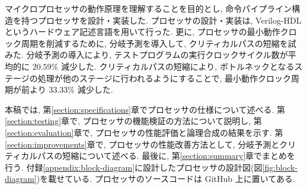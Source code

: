 \documentclass[../main.tex]{subfiles}
\begin{document}
  マイクロプロセッサの動作原理を理解することを目的とし, 
  命令パイプライン構造を持つプロセッサを設計・実装した.
  プロセッサの設計・実装は, Verilog-HDL というハードウェア記述言語を用いて行った.
  更に, プロセッサの最小動作クロック周期を削減するために, 
  分岐予測を導入して, クリティカルパスの短縮を試みた.
  分岐予測の導入により, テストプログラムの実行クロックサイクル数が平均的に $20.59\%$ 減少した.
  クリティカルパスの短縮により, 
  ボトルネックとなるステージの処理が他のステージに行われるようにすることで, 
  最小動作クロック周期が前より $33.33\%$ 減少した.

  本稿では, 第\ref{section:specifications}章でプロセッサの仕様について述べる.
  第\ref{section:testing}章で, プロセッサの機能検証の方法について説明し, 
  第\ref{section:evaluation}章で, プロセッサの性能評価と論理合成の結果を示す.
  第\ref{section:improvements}章で, プロセッサの性能改善方法として, 分岐予測とクリティカルパスの短縮について述べる.
  最後に, 第\ref{section:summary}章でまとめを行う.
  付録\ref{appendix:block-diagram}に設計したプロセッサの設計図(図\ref{fig:block-diagram})を載せている.
  プロセッサのソースコードは GitHub \footnotemark 上に置いてある.
\end{document}
